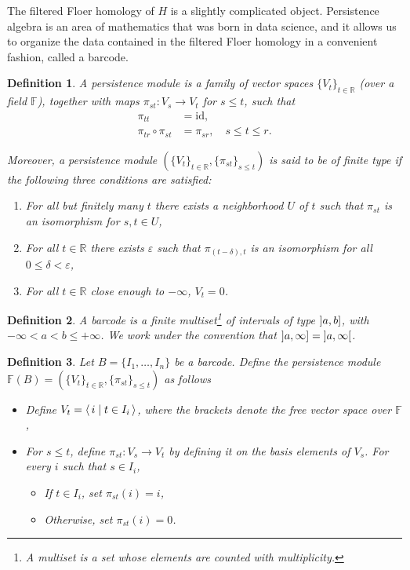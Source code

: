 \documentclass[11pt, a4paper]{article}
\newtheorem{definition}{Definition}
\theoremstyle{nonumberplain}
\newcommand{\R}{\mathbb{R}}
\newcommand{\FF}{\mathbb{F}}
\newcommand{\id}{\mathrm{id}}
\DeclarePairedDelimiter{\braket}{\langle}{\rangle}
\newcommand{\asidesize}{\scriptsize}
\begin{document}
The filtered Floer homology of $H$ is a slightly complicated object. Persistence algebra is an area of mathematics that was born in data science, and it allows us to organize the data contained in the filtered Floer homology in a convenient fashion, called a barcode.

{\asidesize
\begin{definition}
A persistence module is a family of vector spaces $\{V_t\}_{t \in \R}$ (over a field $\FF$), together with maps $\pi_{st} \colon V_s \to V_t$ for $s \leq t$, such that
\begin{align}
\pi_{tt} &= \id,\\
\pi_{tr} \circ \pi_{st} &= \pi_{sr}, \quad s \leq t \leq r.
\end{align}

Moreover, a persistence module $(\{V_t\}_{t \in \R}, \{\pi_{st}\}_{s\leq t})$ is said to be of \emph{finite type} if the following three conditions are satisfied:
\begin{enumerate}
\item For all but finitely many $t$ there exists a neighborhood $U$ of $t$ such that $\pi_{st}$ is an isomorphism for $s, t \in U$,
\item For all $t \in \R$ there exists $\varepsilon$ such that $\pi_{(t-\delta), t}$ is an isomorphism for all $0 \leq \delta < \varepsilon$,
\item\label{pm3} For all $t \in \R$ close enough to $-\infty$, $V_t = 0$.
\end{enumerate}
\end{definition}

\begin{definition}
A \emph{barcode} is a finite multiset\footnote{A multiset is a set whose elements are counted with multiplicity.} of intervals of type $\linterval a b$, with $-\infty < a < b \leq +\infty$. We work under the convention that $\linterval a \infty = \ointerval a \infty$.
\end{definition}

\begin{definition}
Let $B = \{I_1, \dots, I_n\}$ be a barcode. Define the persistence module $\FF(B) = (\{V_t\}_{t \in \R}, \{\pi_{st}\}_{s \leq t})$ as follows
\begin{itemize}
\item Define $V_t = \braket{\,i \mid t \in I_i\,}$, where the brackets denote the free vector space over $\FF$,
\item For $s \leq t$, define $\pi_{st} \colon V_s \to V_t$ by defining it on the basis elements of $V_s$. For every $i$ such that $s \in I_i$,
\begin{itemize}
\item If $t \in I_i$, set $\pi_{st}(i) = i$,
\item Otherwise, set $\pi_{st}(i) = 0$.
\end{itemize}
\end{itemize}
\end{definition}
}
\end{document}
